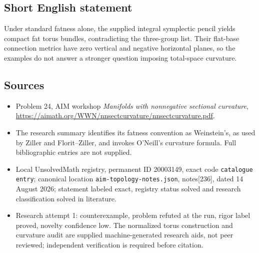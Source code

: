 \documentclass[11pt]{article}
\begin{document}
\subsection{Short English statement}
Under standard fatness alone, the supplied integral symplectic pencil yields compact fat torus bundles, contradicting the three-group list. Their flat-base connection metrics have zero vertical and negative horizontal planes, so the examples do not answer a stronger question imposing total-space curvature.
\subsection{Sources}
\begin{itemize}
\item Problem 24, AIM workshop \emph{Manifolds with nonnegative sectional curvature}, \url{https://aimath.org/WWN/nnsectcurvature/nnsectcurvature.pdf}.
\item The research summary identifies its fatness convention as Weinstein's, as used by Ziller and Florit--Ziller, and invokes O'Neill's curvature formula. Full bibliographic entries are not supplied.
\item Local UnsolvedMath registry, permanent ID 20003149, exact code \texttt{catalogue entry}; canonical location \texttt{aim-topology-notes.json}, notes[236], dated 14 August 2026; statement labeled exact, registry status solved and research classification solved in literature.
\item Research attempt 1: counterexample, problem refuted at the run, rigor label proved, novelty confidence low. The normalized torus construction and curvature audit are supplied machine-generated research aids, not peer reviewed; independent verification is required before citation.
\end{itemize}
\end{document}
